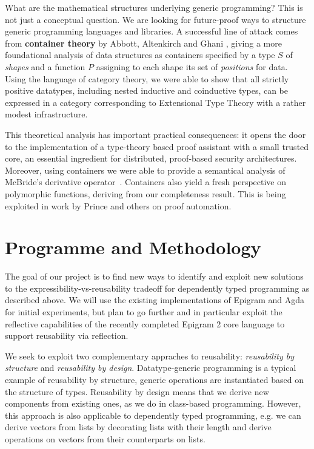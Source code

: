 \documentclass[a4paper]{article}
\begin{document}
What are the mathematical structures underlying generic programming?
This is not just a conceptual question. We are looking for
future-proof ways to structure generic programming languages and
libraries. A successful line of attack comes from \textbf{container
  theory} by Abbott, Altenkirch and Ghani
\cite{alti:fossacs03,alti:tlca03,alti:jpartial,alti:mpc04,alti:cont-tcs,abbott-phd},
giving a more foundational analysis of data structures as
containers specified by a type $S$ of \emph{shapes} and a function
$P$ assigning to each shape its set of \emph{positions} for data. Using the
language of category theory, we were able to show that all strictly
positive datatypes, including nested inductive and coinductive types,
can be expressed in a category corresponding to Extensional Type
Theory with a rather modest infrastructure.

This theoretical analysis has important
practical consequences: it opens the door to the implementation of a
type-theory based proof assistant with a small trusted core, an
essential ingredient for distributed, proof-based security
architectures.  Moreover, using containers we were able to provide a
semantical analysis \cite{alti:tlca03,alti:jpartial} of McBride's
derivative operator~\cite{conor:derivative}.  Containers also yield
a fresh perspective on polymorphic functions, deriving from our
completeness result. This is being exploited in work by Prince
and others \cite{Rawle} on proof automation.

\section{Programme and Methodology}

The goal of our project is to find new ways to identify and exploit
new solutions to the expressibility-vs-reusability tradeoff for dependently
typed programming as described above. We will use the existing
implementations of Epigram and Agda for initial experiments, but plan
to go further and in particular exploit the reflective capabilities of
the recently completed Epigram 2 core language to support reusability
via reflection. 

We seek to exploit two complementary appraches to reusability:
\emph{reusability by structure} and \emph{reusability by
  design}. Datatype-generic programming is a typical example of
reusability by structure, generic operations are instantiated based on
the structure of types. Reusability by design means that we derive new
components from existing ones, as we do in class-based
programming. However, this approach is also applicable to dependently
typed programming, e.g. we can derive vectors from lists by decorating
lists with their length and derive operations on vectors from their
counterparts on lists.
\end{document}
